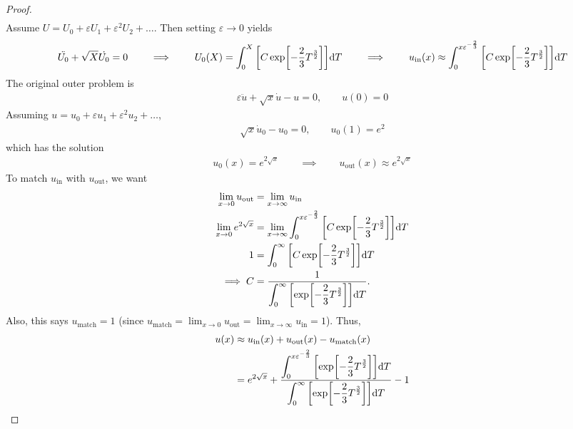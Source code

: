 \documentclass{article} %
\theoremstyle{plain}
\newcommand{\E}{\varepsilon}
\numberwithin{equation}{section} %
\numberwithin{figure}{section} %
\numberwithin{table}{section} %
\begin{document}
\begin{proof}
\begin{align*}
    \end{align*}
    Assume $U = U_0 + \E U_1 + \E^2 U_2 + \dots$.  Then setting $\E \rightarrow 0$ yields
    \begin{align*}
        \ddot{U_0} + \sqrt{X}\dot{U_0} = 0 \qquad \implies \qquad U_0(X) = \int_0^X \qty[C\exp[-\frac{2}{3}T^{\frac{3}{2}}]]\dd T \qquad \implies \qquad u_\text{in}(x) \approx \int_0^{x\E^{-\frac{2}{3}}}\qty[C\exp[-\frac{2}{3}T^{\frac{3}{2}}]]\dd T
    \end{align*}
    The original outer problem is
    \begin{align*}
        \E \ddot{u} + \sqrt{x}\dot{u} - u = 0, \qquad u(0) = 0
    \end{align*}
    Assuming $u = u_0 + \E u_1 + \E^2 u_2 + \dots$,
    \begin{align*}
        \sqrt{x}\dot{u}_0 - u_0 = 0, \qquad u_0(1) = e^2
    \end{align*}
    which has the solution
    \begin{align*}
        u_0(x) = e^{2\sqrt{x}} \qquad \implies \qquad u_{\text{out}}(x) \approx e^{2\sqrt{x}}
    \end{align*}
    To match $u_\text{in}$ with $u_\text{out}$, we want
    \begin{align*}
        \lim_{x \rightarrow 0} u_\text{out} &= \lim_{x \rightarrow \infty} u_\text{in} \\
        \lim_{x \rightarrow 0} e^{2\sqrt{x}} &= \lim_{x \rightarrow \infty} \int_0^{x\E^{-\frac{2}{3}}}\qty[C\exp[-\frac{2}{3}T^{\frac{3}{2}}]]\dd T \\
        1 &= \int_0^\infty \qty[C\exp[-\frac{2}{3}T^{\frac{3}{2}}]]\dd T \\
        \implies C &= \frac{1}{\displaystyle\int_0^\infty \qty[\exp[-\frac{2}{3}T^{\frac{3}{2}}]]\dd T}.
    \end{align*}
    Also, this says $u_\text{match} = 1$ (since $u_{\text{match}} = \lim_{x \rightarrow 0} u_{\text{out}} = \lim_{x \rightarrow \infty} u_{\text{in}} = 1$).
    Thus,
    \begin{align*}
        u(x) &\approx u_\text{in}(x) + u_\text{out}(x) - u_\text{match}(x) \\
        &= e^{2\sqrt{x}} + \displaystyle\frac{\displaystyle\int_0^{x\E^{-\frac{2}{3}}}\qty[\exp[-\frac{2}{3}T^{\frac{3}{2}}]]\dd T}{\displaystyle\int_0^\infty\qty[\exp[-\frac{2}{3}T^{\frac{3}{2}}]]\dd T} - 1
    \end{align*}
\end{proof}
\end{document}
